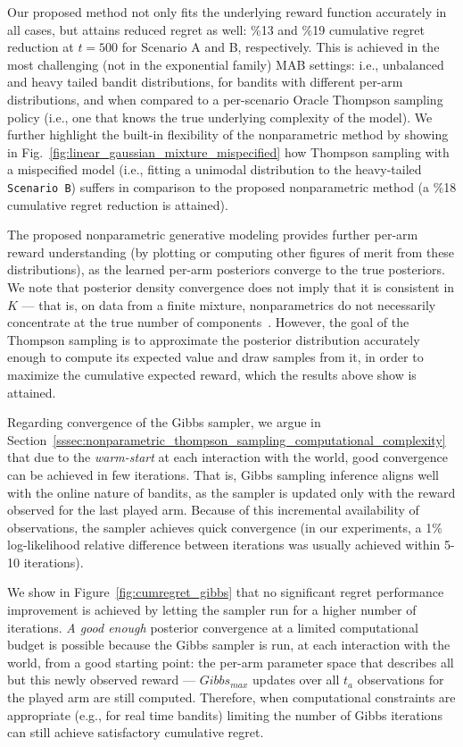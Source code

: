 \documentclass{article}
\newcommand{\ie}{i.e., }
\newcommand{\eg}{e.g., }
\begin{document}
Our proposed method not only fits the underlying reward function accurately in all cases, but attains reduced regret as well: \%13 and \%19 cumulative regret reduction at $t=500$ for Scenario A and B, respectively. This is achieved in the most challenging (not in the exponential family) MAB settings: \ie unbalanced and heavy tailed bandit distributions, for bandits with different per-arm distributions, and when compared to a per-scenario Oracle Thompson sampling policy (\ie one that knows the true underlying complexity of the model).
We further highlight the built-in flexibility of the nonparametric method by showing in Fig.~\ref{fig:linear_gaussian_mixture_mispecified} how Thompson sampling with a mispecified model (\ie fitting a unimodal distribution to the heavy-tailed \texttt{Scenario B}) suffers in comparison to the proposed nonparametric method (a \%18 cumulative regret reduction is attained).

The proposed nonparametric generative modeling provides further per-arm reward understanding (by plotting or computing other figures of merit from these distributions), as the learned per-arm posteriors converge to the true posteriors. We note that posterior density convergence does not imply that it is consistent in $K$ --- that is, on data from a finite mixture, nonparametrics do not necessarily concentrate at the true number of components~\cite{j-Miller2014}. However, the goal of the Thompson sampling is to approximate the posterior distribution accurately enough to compute its expected value and draw samples from it, in order to maximize the cumulative expected reward, which the results above show is attained.

Regarding convergence of the Gibbs sampler, we argue in Section~\ref{sssec:nonparametric_thompson_sampling_computational_complexity} that due to the \textit{warm-start} at each interaction with the world, good convergence can be achieved in few iterations. That is, Gibbs sampling inference aligns well with the online nature of bandits, as the sampler is updated only with the reward observed for the last played arm. Because of this incremental availability of observations, the sampler achieves quick convergence (in our experiments, a 1\% log-likelihood relative difference between iterations was usually achieved within 5-10 iterations).

We show in Figure~\ref{fig:cumregret_gibbs} that no significant regret performance improvement is achieved by letting the sampler run for a higher number of iterations. \textit{A good enough} posterior convergence at a limited computational budget is possible because the Gibbs sampler is run, at each interaction with the world, from a good starting point: the per-arm parameter space that describes all but this newly observed reward --- $Gibbs_{max}$ updates over all $t_a$ observations for the played arm are still computed.
Therefore, when computational constraints are appropriate (\eg for real time bandits) limiting the number of Gibbs iterations can still achieve satisfactory cumulative regret.
\end{document}
